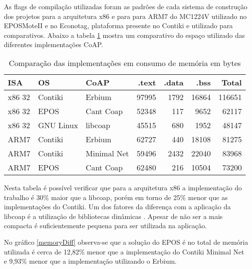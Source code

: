 As flags de compila\c{c}\~ao utilizadas foram as padr\~oes de cada sistema de constru\c{c}\~ao dos projetos para a arquitetura x86 e para para ARM7 do MC1224V utilizado no EPOSMoteII e no Econotag, plataforma presente no Contiki e utilizado para comparativos. Abaixo a tabela \ref{comparacaoCoap} mostra um comparativo do espa\c{c}o utilizado das diferentes implementa\c{c}\~oes CoAP.


\begin{table}[H]
\label{comparacaoCoap}
\centering
\begin{tabular}{@{}p{1cm}p{1cm}p{1cm}r{1cm}r{1cm}r{1cm}r{1cm}@{}}
    \toprule
    ISA & OS & CoAP & .text & .data & .bss & Total\\ \midrule
    x86 32& Contiki & Erbium & 97995 & 1792 & 16864 & 116651 \\
    x86 32& EPOS & Cant Coap & 52348 & 117 & 9652 & 62117 \\
    x86 32& GNU Linux & libcoap & 45515 & 680 & 1952 & 48147\\ \hline
    ARM7 & Contiki & Erbium & 62727 & 440 & 18108 & 81275\\
    ARM7 & Contiki & Minimal Net & 59496 & 2432 & 22040 & 83968\\
    ARM7 & EPOS & Cant Coap & 62480 & 216 & 10504 & 73200\\
    \bottomrule
\end{tabular}
\caption{Compara\c{c}\~ao das implementa\c{c}\~oes em consumo de mem\'oria em bytes}
\end{table}

Nesta tabela \'e poss\'ivel verificar que para a arquitetura x86 a implementa\c{c}\~ao do trabalho \'e 30\% maior que a libcoap, por\'em em torno de 25\% menor que as implementa\c{c}\~oes do Contiki. Um dos fatores da diferen\c{c}a com a aplica\c{c}\~ao da libcoap \'e a utiliza\c{c}\~ao de bibliotecas din\^amicas \cite{ibmCodeSize}. Apesar de n\~ao ser a mais compacta \'e suficientemente pequena para ser utilizada na aplica\c{c}\~ao.

No gr\'afico \ref{memoryDiff} observa-se que a solu\c{c}\~ao do EPOS \'e no total de mem\'oria utilizada \'e cerca de 12,82\% menor que a implementa\c{c}\~ao do Contiki Minimal Net e 9,93\% menor que a implementa\c{c}\~ao utilizando o Erbium.

